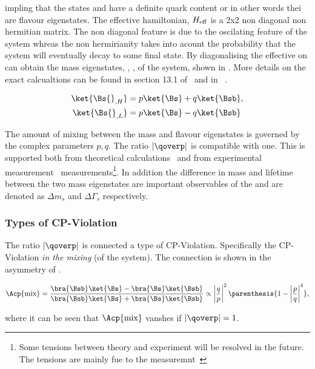 \noindent impling that the states \Bs and \Bsb have a definite quark content or in other words
thei are flavour eigenstates. The effective hamiltonian, $H_{\rm eff}$ is a 2x2 non diagonal non hermitian matrix.
The non diagonal feature is due to the oscilating feature of the \BBbarSyst system whreas the non
hermirianity takes into acount the probability that the system will eventually decay to some final state.
By diagonalising the effective on can obtain the mass eigenstates, , , of the system, shown in .
More details on the exact calcualtions can be found in section 13.1 of~\cite{PDG} and in ~\cite{jeroenThesis,DeBruyn-thesis}.

\begin{align}
\ket{\Bs{}_{,H}} &= p \ket{\Bs} + q \ket{\Bsb}, \nonumber \\
\ket{\Bs{}_{,L}} &= p \ket{\Bs} - q \ket{\Bsb}
\label{bs_mass_eigen}
\end{align}

The amount of mixing between the mass and flavour eigenstates is governed by the complex parameters $p,q$.
The ratio $|\qoverp|$ is compatible with one. This is supported both from theoretical calculations~\cite{Lenz:2011ti}
and from experimental measurement~\cite{asl-paper} measurements\footnote{Some tensions between theory and experiment will be resolved in the future. The tensions are
mainly fue to the \dzero measuremnt~\cite{Abazov:2013uma}}. In addition the difference in mass and lifetime between the two
mass eigenstates are important observables of the \BBbarSyst and are denoted as $\Delta m_s$ and $\Delta\Gamma_s$ respectively.

\subsubsection{Types of CP-Violation}
The ratio $|\qoverp|$ is connected a type of CP-Violation. Specifically the CP-Violation {\it in the mixing} (of the \BBbarSyst system).
The connection is shown in the asymmetry of .

\begin{equation}
\Acp{\text{mix}}      = \frac{\bra{\Bsb}\ket{\Bs} - \bra{\Bs}\ket{\Bsb}} {\bra{\Bsb}\ket{\Bs} + \bra{\Bs}\ket{\Bsb}}
                \propto \left|\frac{q}{p}\right|^2 \parenthesis{ 1 - \left|\frac{p}{q}\right|^4},
\label{acp_mixing}
\end{equation}

\noindent where it can be seen that $\Acp{\text{mix}}$ vanshes if $|\qoverp|= 1$.

